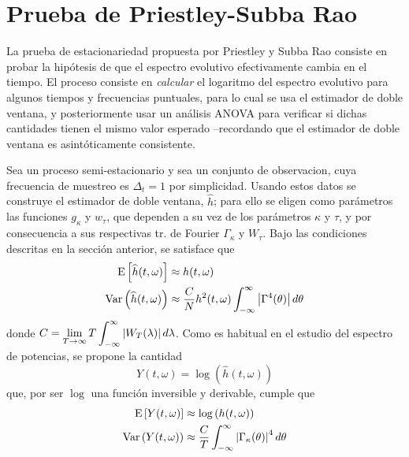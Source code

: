 
\section{Prueba de Priestley-Subba Rao}

La prueba de estacionariedad propuesta por Priestley y Subba Rao \cite{Priestley69} consiste en 
probar la hipótesis de que el espectro evolutivo efectivamente cambia en el tiempo. 
%
El proceso consiste en \textit{calcular} el logaritmo del espectro evolutivo para algunos tiempos y 
frecuencias puntuales, para lo cual se usa el estimador de doble ventana, y posteriormente usar un
análisis ANOVA para verificar si dichas cantidades tienen el mismo valor esperado --recordando que
el estimador de doble ventana es asintóticamente consistente.

Sea \xt un proceso semi-estacionario y sea \xtd un conjunto de observacion, cuya frecuencia de 
muestreo es $\Delta_t=1$ por simplicidad.
%
Usando estos datos se construye el estimador de doble ventana, $\widehat{h}$; para ello se eligen 
como parámetros las funciones $g_\kappa$ y $w_\tau$, que dependen a su vez de los parámetros 
$\kappa$ y $\tau$, y por consecuencia a sus respectivas tr. de Fourier $\Gamma_\kappa$ y $W_\tau$.
%
Bajo las condiciones descritas en la sección anterior, se satisface que
%
\begin{align*}
\mathrm{E}\left[ \widehat{h}(t,\omega) \right] &\approx h(t,\omega) \\
\mathrm{Var}\left( \widehat{h}(t,\omega) \right) &\approx 
\frac{C}{N} h^{2}(t,\omega) \int_{-\infty}^{\infty} \left| \Gamma^{4}(\theta) \right| d\theta
\end{align*}
%
donde $\displaystyle C = \lim_{T\rightarrow \infty} T \int_{-\infty}^{\infty} \left| W_T(\lambda) \right| d\lambda$.
%
Como es habitual en el estudio del espectro de potencias, se propone la cantidad 
\begin{equation}
Y(t,\omega) = \log\left(\widehat{h}(t,\omega)\right)
\end{equation}
que, por ser $\log$ una función inversible y derivable, cumple que
%
\begin{align*}
\mathrm{E}\left[ Y(t,\omega) \right] &\approx \log\left(h(t,\omega)\right) \\
\mathrm{Var}\left( Y(t,\omega) \right) &\approx 
\frac{C}{T} \int_{-\infty}^{\infty} \left| \Gamma_\kappa(\theta) \right|^{4} d\theta \\
\end{align*}

